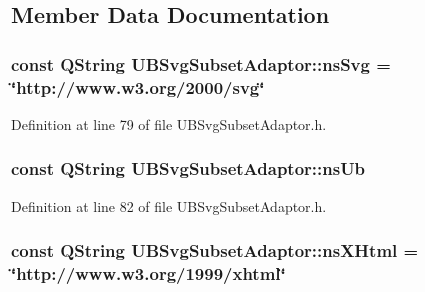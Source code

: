 \subsection{Member Data Documentation}
\hypertarget{class_u_b_svg_subset_adaptor_a407409ee2324e304a9c2404eb8965b05}{
\subsubsection[{ns\-Svg}]{\setlength{\rightskip}{0pt plus 5cm}const Q\-String U\-B\-Svg\-Subset\-Adaptor\-::ns\-Svg = \char`\"{}http\-://www.\-w3.\-org/2000/svg\char`\"{}\hspace{0.3cm}{\ttfamily [static]}}}\label{d3/df9/class_u_b_svg_subset_adaptor_a407409ee2324e304a9c2404eb8965b05}


Definition at line 79 of file U\-B\-Svg\-Subset\-Adaptor.\-h.

\hypertarget{class_u_b_svg_subset_adaptor_abaaf7694f1e36b620703f0adc2385967}{
\subsubsection[{ns\-Ub}]{\setlength{\rightskip}{0pt plus 5cm}const Q\-String U\-B\-Svg\-Subset\-Adaptor\-::ns\-Ub\hspace{0.3cm}{\ttfamily [static]}}}\label{d3/df9/class_u_b_svg_subset_adaptor_abaaf7694f1e36b620703f0adc2385967}


Definition at line 82 of file U\-B\-Svg\-Subset\-Adaptor.\-h.

\hypertarget{class_u_b_svg_subset_adaptor_a3448a034e9c845f9c0ce1c3c87f8cc77}{
\subsubsection[{ns\-X\-Html}]{\setlength{\rightskip}{0pt plus 5cm}const Q\-String U\-B\-Svg\-Subset\-Adaptor\-::ns\-X\-Html = \char`\"{}http\-://www.\-w3.\-org/1999/xhtml\char`\"{}\hspace{0.3cm}{\ttfamily [static]}}}\label{d3/df9/class_u_b_svg_subset_adaptor_a3448a034e9c845f9c0ce1c3c87f8cc77}


